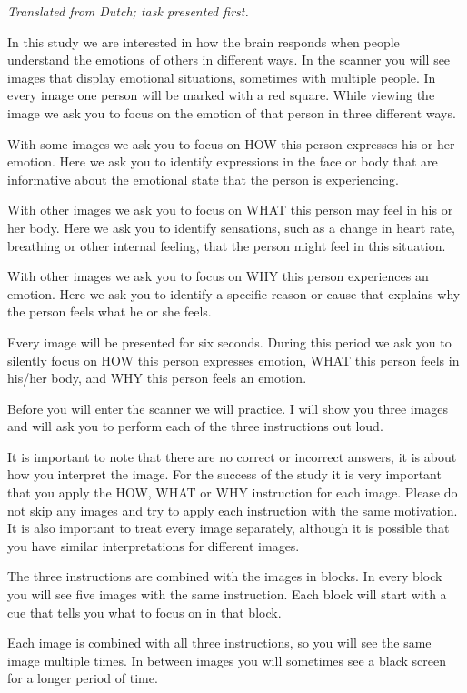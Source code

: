 \documentclass[12pt,american,a4paper,oneside,]{memoir} %
\begin{document}
\emph{Translated from Dutch; task presented first.}

In this study we are interested in how the brain responds when people understand the emotions of others in different ways. In the scanner you will see images that display emotional situations, sometimes with multiple people. In every image one person will be marked with a red square. While viewing the image we ask you to focus on the emotion of that person in three different ways.

With some images we ask you to focus on HOW this person expresses his or her emotion. Here we ask you to identify expressions in the face or body that are informative about the emotional state that the person is experiencing.

With other images we ask you to focus on WHAT this person may feel in his or her body. Here we ask you to identify sensations, such as a change in heart rate, breathing or other internal feeling, that the person might feel in this situation.

With other images we ask you to focus on WHY this person experiences an emotion. Here we ask you to identify a specific reason or cause that explains why the person feels what he or she feels.

Every image will be presented for six seconds. During this period we ask you to silently focus on HOW this person expresses emotion, WHAT this person feels in his/her body, and WHY this person feels an emotion.

Before you will enter the scanner we will practice. I will show you three images and will ask you to perform each of the three instructions out loud.

It is important to note that there are no correct or incorrect answers, it is about how you interpret the image. For the success of the study it is very important that you apply the HOW, WHAT or WHY instruction for each image. Please do not skip any images and try to apply each instruction with the same motivation. It is also important to treat every image separately, although it is possible that you have similar interpretations for different images.

The three instructions are combined with the images in blocks. In every block you will see five images with the same instruction. Each block will start with a cue that tells you what to focus on in that block.

Each image is combined with all three instructions, so you will see the same image multiple times. In between images you will sometimes see a black screen for a longer period of time.
\end{document}
